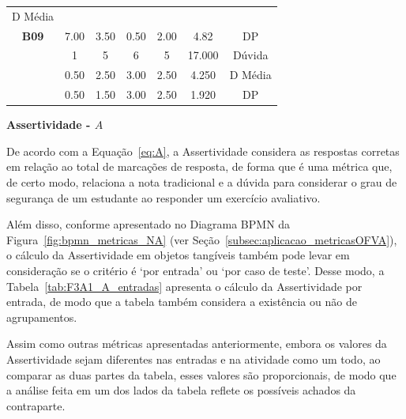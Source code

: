 \begin{table}[htbp]
\begin{tabular}{|ccccccc|}
		D Média \\ \cline{2-7} 
		\multicolumn{1}{|c|}{\multirow{-3}{*}{\cellcolor[HTML]{F2F2F2}\textbf{B09}}} &
		\multicolumn{1}{c|}{7.00} &
		\multicolumn{1}{c|}{3.50} &
		\multicolumn{1}{c|}{0.50} &
		\multicolumn{1}{c|}{2.00} &
		\multicolumn{1}{c|}{4.82} &
		DP \\ \hline
		\rowcolor[HTML]{D9D9D9} 
		\multicolumn{1}{|c|}{\cellcolor[HTML]{F2F2F2}} &
		\multicolumn{1}{c|}{\cellcolor[HTML]{D9D9D9}1} &
		\multicolumn{1}{c|}{\cellcolor[HTML]{D9D9D9}5} &
		\multicolumn{1}{c|}{\cellcolor[HTML]{D9D9D9}6} &
		\multicolumn{1}{c|}{\cellcolor[HTML]{D9D9D9}5} &
		\multicolumn{1}{c|}{\cellcolor[HTML]{D9D9D9}17.000} &
		Dúvida \\ \cline{2-7} 
		\multicolumn{1}{|c|}{\cellcolor[HTML]{F2F2F2}} &
		\multicolumn{1}{c|}{0.50} &
		\multicolumn{1}{c|}{2.50} &
		\multicolumn{1}{c|}{3.00} &
		\multicolumn{1}{c|}{2.50} &
		\multicolumn{1}{c|}{4.250} &
		D Média \\ \cline{2-7} 
		\rowcolor[HTML]{D9D9D9} 
		\multicolumn{1}{|c|}{\multirow{-3}{*}{\cellcolor[HTML]{F2F2F2}\textbf{B10}}} &
		\multicolumn{1}{c|}{\cellcolor[HTML]{D9D9D9}0.50} &
		\multicolumn{1}{c|}{\cellcolor[HTML]{D9D9D9}1.50} &
		\multicolumn{1}{c|}{\cellcolor[HTML]{D9D9D9}3.00} &
		\multicolumn{1}{c|}{\cellcolor[HTML]{D9D9D9}2.50} &
		\multicolumn{1}{c|}{\cellcolor[HTML]{D9D9D9}1.920} &
		DP \\ \hline
	\end{tabular}
	\label{tab:F3A1_Duvida_casos_comagrupamento}
\end{table}

\textbf{Assertividade - $A$}

De acordo com a Equação~\ref{eq:A}, a Assertividade considera as respostas corretas em relação ao total de marcações de resposta, de forma que é uma métrica que, de certo modo, relaciona a nota tradicional e a dúvida para considerar o grau de segurança de um estudante ao responder um exercício avaliativo.


Além disso, conforme apresentado no Diagrama BPMN da Figura~\ref{fig:bpmn_metricas_NA} (ver Seção~\ref{subsec:aplicacao_metricasOFVA}), o cálculo da Assertividade em objetos tangíveis também pode levar em consideração se o critério é `por entrada' ou `por caso de teste'. Desse modo, a Tabela~\ref{tab:F3A1_A_entradas} apresenta o cálculo da Assertividade por entrada, de modo que a tabela também considera a existência ou não de agrupamentos.

Assim como outras métricas apresentadas anteriormente, embora os valores da Assertividade sejam diferentes nas entradas e na atividade como um todo, ao comparar as duas partes da tabela, esses valores são proporcionais, de modo que a análise feita em um dos lados da tabela reflete os possíveis achados da contraparte.

